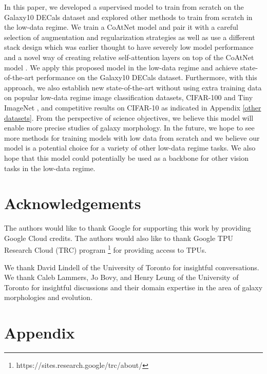 \documentclass{article} \usepackage{iclr2023_conference,times}
\begin{document}
In this paper, we developed a supervised model to train from scratch on the Galaxy10 DECals dataset and explored other methods to train from scratch in the low-data regime. We train a CoAtNet model and pair it with a careful selection of augmentation and regularization strategies as well as use a different stack design which was earlier thought to have severely low model performance and a novel way of creating relative self-attention layers on top of the CoAtNet model \citep{dai2021coatnet}. We apply this proposed model in the low-data regime and achieve state-of-the-art performance on the Galaxy10 DECals dataset. Furthermore, with this approach, we also establish new state-of-the-art without using extra training data on popular low-data regime image classification datasets, CIFAR-100 \citep{krizhevsky2009learning} and Tiny ImageNet \citep{le2015tiny}, and competitive results on CIFAR-10 \citep{krizhevsky2009learning} as indicated in Appendix \ref{other datasets}. From the perspective of science objectives, we believe this model will enable more precise studies of galaxy morphology. In the future, we hope to see more methods for training models with low data from scratch and we believe our model is a potential choice for a variety of other low-data regime tasks. We also hope that this model could potentially be used as a backbone for other vision tasks in the low-data regime.

\section*{Acknowledgements}

The authors would like to thank Google for supporting this work by providing Google Cloud credits. The authors would also like to thank Google TPU Research Cloud (TRC) program \footnote{https://sites.research.google/trc/about/} for providing access to TPUs.

We thank David Lindell of the University of Toronto for insightful conversations. We thank Caleb Lammers, Jo Bovy, and Henry Leung of the University of Toronto for insightful discussions and their domain expertise in the area of galaxy morphologies and evolution.




\newpage
\appendix
\section{Appendix}
\end{document}
